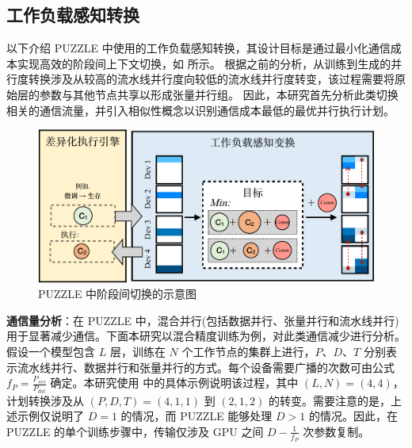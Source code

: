 \subsection{工作负载感知转换}
\label{subsection:inter-stage-workload-aware-trans-engine}

以下介绍 PUZZLE 中使用的工作负载感知转换，其设计目标是通过最小化通信成本实现高效的阶段间上下文切换，如 所示。
根据之前的分析，从训练到生成的并行度转换涉及从较高的流水线并行度向较低的流水线并行度转变，该过程需要将原始层的参数与其他节点共享以形成张量并行组。
因此，本研究首先分析此类切换相关的通信流量，并引入相似性概念以识别通信成本最低的最优并行执行计划。  


\begin{figure}[t]
    \centering
    \includegraphics[width=0.75\linewidth]{figures/puzzle/5-inter-stage-section-overview-crop.pdf}
    \caption{PUZZLE 中阶段间切换的示意图}
    \label{fig:inter-stage-section-overview}
\end{figure}


\textbf{通信量分析}：在 PUZZLE 中，混合并行(包括数据并行、张量并行和流水线并行)用于显著减少通信。下面本研究以混合精度训练为例，对此类通信减少进行分析。  
假设一个模型包含 $L$ 层，训练在 $N$ 个工作节点的集群上进行，$P$、$D$、$T$ 分别表示流水线并行、数据并行和张量并行的方式。每个设备需要广播的次数可由公式 $f_{P}=\frac{P_{src}}{P_{dst}}$ 确定。本研究使用 中的具体示例说明该过程，其中 $(L,N)=(4,4)$，计划转换涉及从 $(P, D, T)=(4,1,1)$ 到 $(2,1,2)$ 的转变。需要注意的是，上述示例仅说明了 $D=1$ 的情况，而 PUZZLE 能够处理 $D>1$ 的情况。因此，在 PUZZLE 的单个训练步骤中，传输仅涉及 GPU 之间 $D-\frac{1}{f_{P}}$ 次参数复制。  



